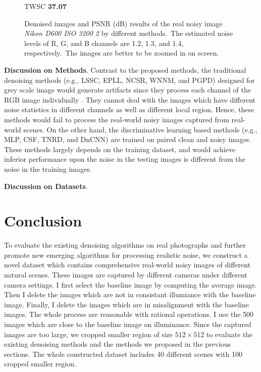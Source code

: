 \begin{figure}
{\begin{minipage}[t]{0.24\textwidth}
{\footnotesize TWSC \textbf{37.07}}
\end{minipage}
}
\caption{Denoised images and PSNR (dB) results of the real noisy image \textsl{Nikon D600 ISO 3200 2} \cite{crosschannel2016} by different methods.\ The estimated noise levels of R, G, and B channels are 1.2, 1.3, and 1.4, respectively.\ The images are better to be zoomed in on screen.}
    \label{fig6-7}
\end{figure}


\textbf{Discussion on Methods}. 
Contrast to the proposed methods, the traditional denoising methods (e.g., LSSC, EPLL, NCSR, WNNM, and PGPD) designed for grey scale image would generate artifacts since they process each channel of the RGB image individually \cite{srcolor}. They cannot deal with the images which have different noise statistics in different channels as well as different local region. Hence, these methods would fail to process the real-world noisy images captured from real-world scenes. On the other hand, the discriminative learning based methods (e.g., MLP, CSF, TNRD, and DnCNN) are trained on paired clean and noisy images. These methods largely depends on the training dataset, and would achieve inferior performance upon the noise in the testing images is different from the noise in the training images.

\textbf{Discussion on Datasets}. 


\section{Conclusion}

To evaluate the existing denoising algorithms on real photographs and further promote new emerging algorithms for processing realistic noise, we construct a novel dataset which contains comprehensive real-world noisy images of different natural scenes. These images are captured by different cameras under different camera settings. I first select the baseline image by computing the average image. Then I delete the images which are not in consistant illumiance with the baseline image. Finally, I delete the images which are in misalignment with the baseline images. The whole process are reasonable with rational operations. I use the 500 images which are close to the baseline image on illuminance. Since the captured images are too large, we cropped smaller region of size $512\times512$ to evaluate the existing denoising methods and the methods we proposed in the previous sections. The whole constructed dataset includes 40 different scenes with 100 cropped smaller region.

